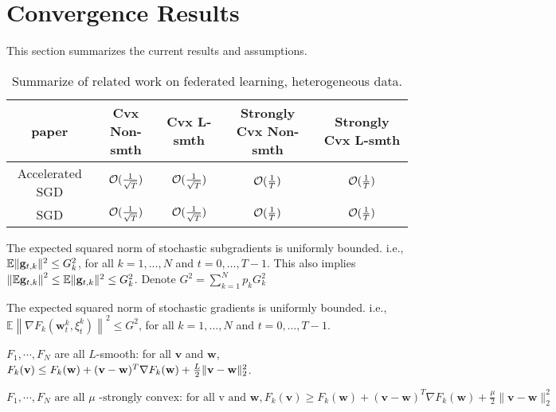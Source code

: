 


\section{Convergence Results}
This section summarizes the current results and assumptions.
\begin{table}[h!]
\centering
\small
	\begin{tabular}{|c|c|c|c|c|}\hline
		paper         &  Cvx Non-smth & Cvx L-smth & Strongly Cvx Non-smth& Strongly Cvx L-smth \\ \hline
	Accelerated	SGD   &   ${\mathcal{O}}(\frac{1}{\sqrt{T}})$     & ${\mathcal{O}}(\frac{1}{\sqrt{T}})$   &    ${\mathcal{O}}(\frac{1}{T})$   &  ${\mathcal{O}}(\frac{1}{T})$    \\\hline
	SGD    &    ${\mathcal{O}}(\frac{1}{\sqrt{T}})$  &   ${\mathcal{O}}(\frac{1}{\sqrt{T}})$  &  ${\mathcal{O}}(\frac{1}{T})$  & ${\mathcal{O}}(\frac{1}{T})$\cite{li2019convergence,haddadpour2019convergence}      \\\hline
	\end{tabular}
	\caption{Summarize of related work on federated learning, heterogeneous data.}
\end{table}



\begin{assumption}
The expected squared norm of stochastic subgradients is uniformly bounded. i.e.,
$\mathbb{E}\|{\mathbf{g}}_{t,k}\|^2  \leq G_k^{2}$, for all $k = 1,..., N$ and $t=0, \dots, T-1$.  This also implies $\left\| \mathbb{E}{\mathbf{g}}_{t,k}\right\|^2  \leq \mathbb{E}\|{\mathbf{g}}_{t,k}\|^2 \leq G_k^2$. Denote $G^2 = \sum_{k=1}^N p_k G_k^2$
\label{ass:subgrad2}
\end{assumption}


\begin{assumption}
The expected squared norm of stochastic gradients is uniformly bounded. i.e.,
$\mathbb{E}\left\|\nabla F_{k}\left(\mathbf{w}_{t}^{k}, \xi_{t}^{k}\right)\right\|^{2} \leq G^{2}$, for all $k = 1,..., N$ and $t=0, \dots, T-1$.
\label{ass:squaregrad}
\end{assumption}

\begin{assumption}[L-smooth]
$F_{1}, \cdots, F_{N}$ are all $L$-smooth: for all  $\mathbf{v}$  and $\mathbf{w}$, $F_{k}(\mathbf{v}) \leq F_{k}(\mathbf{w})+(\mathbf{v}- \\ \mathbf{w})^{T} \nabla F_{k}(\mathbf{w})+\frac{L}{2}\|\mathbf{v}-\mathbf{w}\|_{2}^{2}$.
\label{ass:lsmooth}
\end{assumption}
\begin{assumption}
$	F_{1}, \cdots, F_{N} \text { are all } \mu \text { -strongly convex: for all v and } \mathbf{w}, F_{k}(\mathbf{v}) \geq F_{k}(\mathbf{w})+(\mathbf{v}-\mathbf{w})^{T} \nabla F_{k}(\mathbf{w})+\frac{\mu}{2}\|\mathbf{v}-\mathbf{w}\|_{2}^{2}$
\label{ass:stroncvx}
\end{assumption}


